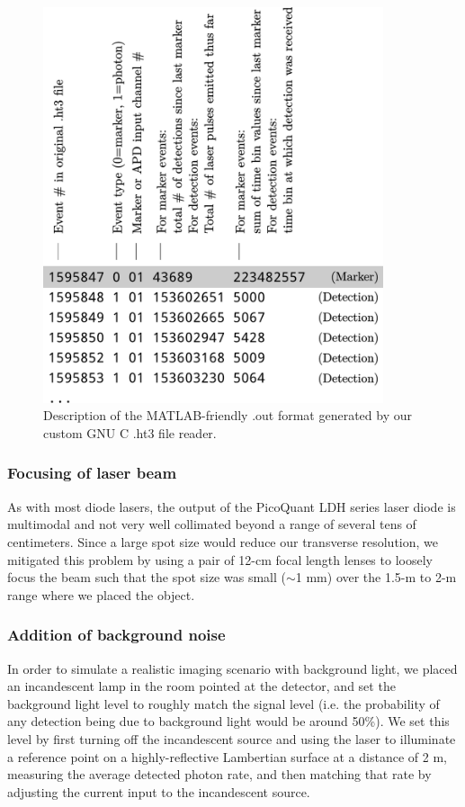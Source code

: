 \begin{figure}[htb]
\centerline{\includegraphics[width=10cm]{figure-first-outformat.pdf}}
\caption{Description of the MATLAB-friendly .out format generated by our custom GNU C .ht3 file reader.}
\label{figure:first-outformat}
\end{figure}

\subsubsection{Focusing of laser beam}
As with most diode lasers, the output of the PicoQuant LDH series laser diode is multimodal and not very well collimated beyond a range of several tens of centimeters. Since a large spot size would reduce our transverse resolution, we mitigated this problem by using a pair of 12-cm focal length lenses to loosely focus the beam such that the spot size was small ($\sim$1 mm) over the 1.5-m to 2-m range where we placed the object.

\subsubsection{Addition of background noise}
In order to simulate a realistic imaging scenario with background light, we placed an incandescent lamp in the room pointed at the detector, and set the background light level to roughly match the signal level (i.e. the probability of any detection being due to background light would be around 50\%). We set this level by first turning off the incandescent source and using the laser to illuminate a reference point on a highly-reflective Lambertian surface at a distance of 2 m, measuring the average detected photon rate, and then matching that rate by adjusting the current input to the incandescent source.

